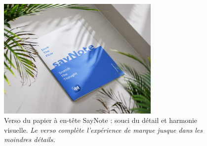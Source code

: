 \begin{figure}[H]
    \centering
    \includegraphics[width=0.7\textwidth]{docs/visual-indentity/pictures/pappier-back.jpg}
    \caption{Verso du papier à en-tête SayNote : souci du détail et harmonie visuelle. \newline\textit{Le verso complète l'expérience de marque jusque dans les moindres détails.}}
\end{figure}






